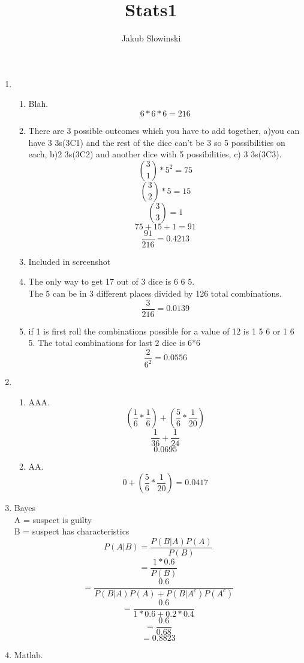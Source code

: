 \documentclass{article}
\title{Stats1}
\author{Jakub Slowinski}
\begin{document}
\begin{enumerate}
  \item 
  \begin{enumerate}[label=(\alph*)]
    \item Blah.
    \[6*6*6=216\]
    \item There are 3 possible outcomes which you have to add together, a)you can have 3 3s(3C1) and the rest of the dice can't be 3 so 5 possibilities on each, b)2 3s(3C2) and another dice with 5 possibilities, c) 3 3s(3C3).
    \[ \binom{3}{1} * 5^2 = 75\]
    \[ \binom{3}{2} * 5   = 15\]
    \[ \binom{3}{3}       = 1 \]
    \[ 75+15+1 = 91 \]
    \[ \frac{91}{216} = 0.4213 \]
    
    \item Included in screenshot
    
    \item The only way to get 17 out of 3 dice is 6 6 5.
    \\ The 5 can be in 3 different places divided by 126 total combinations.
    \[ \frac{3}{216} = 0.0139 \]
    \item if 1 is first roll the combinations possible for a value of 12 is 1 5 6 or 1 6 5. The total combinations for last 2 dice is 6*6
    \[ \frac{2}{6^2} = 0.0556\] 
  \end{enumerate}
  \item
  \begin{enumerate}[label=(\alph*)]
  
    \item AAA.
    \[ (\frac{1}{6}*\frac{1}{6})+(\frac{5}{6}*\frac{1}{20}) \]
    \[ \frac{1}{36} + \frac{1}{24} \]
    \[ 0.0695 \]
    
    \item AA.
    \[ 0+(\frac{5}{6}*\frac{1}{20}) = 0.0417 \]
    
  \end{enumerate}
  \item Bayes
  \\ A = suspect is guilty
  \\ B = suspect has characteristics
  \[ P(A|B) = \frac{P(B|A)P(A)}{P(B)} \]
  \[ = \frac{1*0.6}{P(B)} \]
  \[ = \frac{0.6}{P(B|A)P(A) + P(B|A^c)P(A^c)} \]
  \[ = \frac{0.6}{1*0.6+0.2*0.4} \]
  \[ = \frac{0.6}{0.68} \]
  \[ = 0.8823\]
  \item Matlab.
\end{enumerate}
\end{document}
